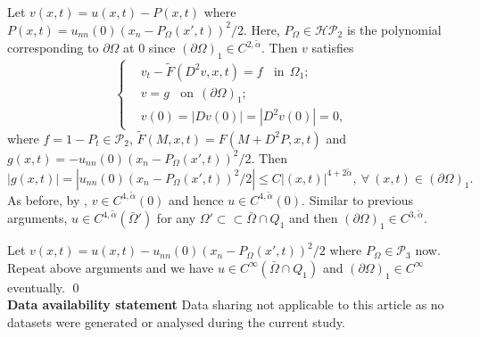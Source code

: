\documentclass[preprint,12pt]{elsarticle}
\theoremstyle{definition}
\theoremstyle{remark}
\newtheorem{remark}[theorem]{Remark}
\numberwithin{equation}{section}
\begin{document}
Let $v(x,t)=u(x,t)-P(x,t)$ where $P(x,t)=u_{nn}(0)\left(x_n-P_{\Omega}(x',t) \right)^2/2$. Here, $P_{\Omega}\in \mathcal{HP}_2$ is the polynomial corresponding to $\partial \Omega$ at $0$ since $(\partial \Omega)_1\in C^{2,\tilde{\alpha}}$. Then $v$ satisfies
\begin{equation*}
\left\{\begin{aligned}
&   v_t-\tilde{F}(D^2 v,x,t)=f~~~~\mbox{in}~~\Omega_1;\\
&   v=g~~~~\mbox{on}~~(\partial \Omega)_1;\\
&   v(0)=|Dv(0)|=|D^2v(0)|=0,
\end{aligned}\right.
\end{equation*}
where $f=1-P_t \in \mathcal{P}_2$, $\tilde{F}(M,x,t)=F(M+D^2 P,x,t)$ and $g(x,t)=-u_{nn}(0)(x_n-P_{\Omega}(x',t))^2/2$. Then
\begin{equation*}
|g(x,t)|=|u_{nn}(0)(x_n-P_{\Omega}(x',t))^2/2|\leq C|(x,t)|^{4+2\tilde{\alpha}},~\forall ~(x,t)\in (\partial \Omega)_1.
\end{equation*}
As before, by , $v\in C^{4, \tilde{\alpha}}(0)$ and hence $u\in C^{4, \tilde{\alpha}}(0)$. Similar to previous arguments, $u\in C^{4,\tilde{\alpha}}(\bar\Omega')$ for any $\Omega'\subset\subset \bar{\Omega}\cap Q_1$ and then $(\partial \Omega)_1\in C^{3,\tilde{\alpha}}$.

Let $v(x,t)=u(x,t)-u_{nn}(0)(x_n-P_{\Omega}(x',t))^2/2$ where $P_{\Omega}\in \mathcal{P}_3$ now. Repeat above arguments and we have $u\in C^{\infty}(\bar\Omega\cap Q_1)$ and $(\partial \Omega)_1\in C^{\infty}$ eventually. \qed~\\

\noindent\textbf{Data availability statement} Data sharing not applicable to this article as no datasets were generated or analysed during the current study.

%
%

%

%
%

\end{document}
